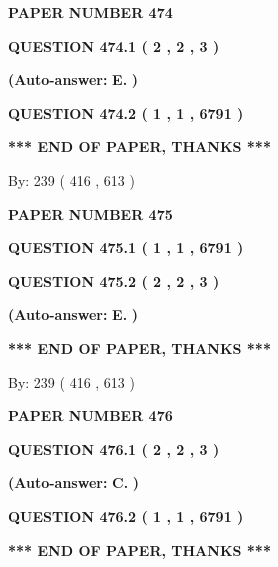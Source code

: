 \documentclass[12pt]{article}
\begin{document}
   
 {\textbf{ \Large{ PAPER NUMBER  474  }}}
   
   
   
   
  
  
{\textbf{\large{QUESTION
474.1 
 ( 2 , 2 , 3 )
}}}
 
 
{\textbf{(Auto-answer:}}
{\textbf{\large{
E.}}}
{\textbf{)}}
 
 
  
  
{\textbf{\large{QUESTION
474.2 
 ( 1 , 1 , 6791 )
}}}
   
   
   
   
\vspace{1.0in} 
{\textbf{\large{ *** END OF PAPER, THANKS *** }}} 
   
   
\hspace{1.0in} By: 
 239 ( 416 ,  613 )
   
   
   
   
\newpage 
\setcounter{page}{ 
   475001 } 
   
   
 {\textbf{ \Large{ PAPER NUMBER  475  }}}
   
   
   
   
  
  
{\textbf{\large{QUESTION
475.1 
 ( 1 , 1 , 6791 )
}}}
  
  
{\textbf{\large{QUESTION
475.2 
 ( 2 , 2 , 3 )
}}}
 
 
{\textbf{(Auto-answer:}}
{\textbf{\large{
E.}}}
{\textbf{)}}
 
 
   
   
   
   
\vspace{1.0in} 
{\textbf{\large{ *** END OF PAPER, THANKS *** }}} 
   
   
\hspace{1.0in} By: 
 239 ( 416 ,  613 )
   
   
   
   
\newpage 
\setcounter{page}{ 
   476001 } 
   
   
 {\textbf{ \Large{ PAPER NUMBER  476  }}}
   
   
   
   
  
  
{\textbf{\large{QUESTION
476.1 
 ( 2 , 2 , 3 )
}}}
 
 
{\textbf{(Auto-answer:}}
{\textbf{\large{
C.}}}
{\textbf{)}}
 
 
  
  
{\textbf{\large{QUESTION
476.2 
 ( 1 , 1 , 6791 )
}}}
   
   
   
   
\vspace{1.0in} 
{\textbf{\large{ *** END OF PAPER, THANKS *** }}} 
   
\end{document}
